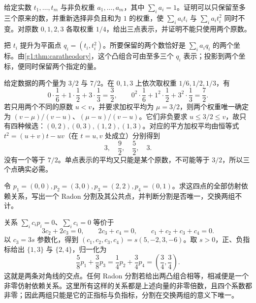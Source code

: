 \begin{exercise}\label{g1:ex:convex-two-moments}
	给定实数 \(t_1,\ldots,t_m\) 与非负权重 \(a_1,\ldots,a_m\)，其中 \(\sum_i a_i=1\)。证明可以只保留至多三个原来的数，并重新选择非负且和为 \(1\) 的权重，使 \(\sum_i a_i t_i\) 与 \(\sum_i a_i t_i^2\) 同时不变。对原数 \(0,1,2,3\) 各取权重 \(1/4\)，给出三点表示，并证明不能只使用两个原数。
\end{exercise}
\begin{solution}
	把 \(t_i\) 提升为平面点 \(q_i=(t_i,t_i^2)\)。所要保留的两个数恰好是 \(\sum_i a_i q_i\) 的两个坐标。由\cref{g1:thm:caratheodory}，这个凸组合可由至多三个 \(q_i\) 表示；投影到两个坐标，便同时保留两个指定的量。

	给定数据的两个量为 \(3/2\) 与 \(7/2\)。在 \(0,1,3\) 上依次取权重 \(1/6,1/2,1/3\)，有
	\[
		0\cdot\frac16+1\cdot\frac12+3\cdot\frac13=\frac32,\qquad
		0^2\cdot\frac16+1^2\cdot\frac12+3^2\cdot\frac13=\frac72.
	\]
	若只用两个不同的原数 \(u<v\)，并要求加权平均为 \(\mu=3/2\)，则两个权重唯一确定为 \((v-\mu)/(v-u)\)、\((\mu-u)/(v-u)\)。它们非负要求 \(u\le3/2\le v\)，故只有四种候选：\((0,2),(0,3),(1,2),(1,3)\)。对应的平方加权平均由恒等式 \(t^2=(u+v)t-uv\)（在 \(t=u,v\) 处成立）分别得到
	\[
		3,\quad \frac92,\quad \frac52,\quad 3.
	\]
	没有一个等于 \(7/2\)。单点表示的平均又只能是某个原数，不可能等于 \(3/2\)，所以三个点确实必需。
\end{solution}

\begin{exercise}\label{g1:ex:radon-explicit}
	令 \(p_1=(0,0),p_2=(3,0),p_3=(2,2),p_4=(0,1)\)。求这四点的全部仿射依赖关系，写出一个 Radon 分割及其公共点，并判断分割是否唯一，交换两组不计。
\end{exercise}
\begin{solution}
	关系 \(\sum_i c_i p_i=0\)、\(\sum_i c_i=0\) 等价于
	\[
		3c_2+2c_3=0,\qquad 2c_3+c_4=0,\qquad c_1+c_2+c_3+c_4=0.
	\]
	以 \(c_3=3s\) 参数化，得到 \((c_1,c_2,c_3,c_4)=s(5,-2,3,-6)\)。取 \(s>0\)，正、负指标给出 \(\{1,3\}\) 与 \(\{2,4\}\)，归一化为
	\[
		\frac58p_1+\frac38p_3=\frac14p_2+\frac34p_4=\left(\frac34,\frac34\right).
	\]
	这就是两条对角线的交点。任何 Radon 分割若给出两凸组合相等，相减便是一个非零仿射依赖关系。这里所有这样的关系都是上述向量的非零倍数，且四个系数都非零；因此两组只能是它的正指标与负指标，分割在交换两组的意义下唯一。
\end{solution}


